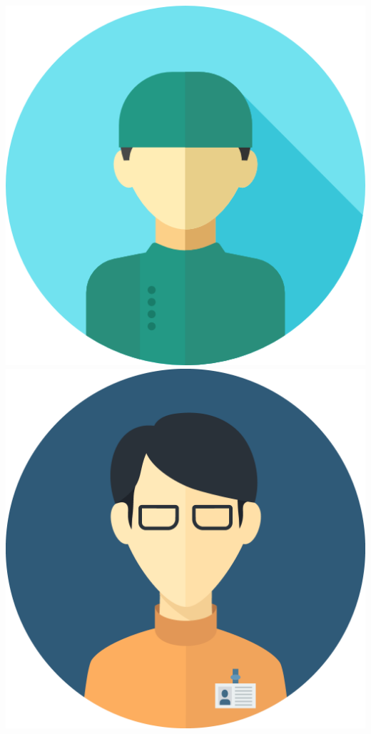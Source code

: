 \begin{frame}
    \hspace{0.4cm}
    \includegraphics[scale=0.1]{Bin/staff_avatars/doctor_2.png}
    \hspace{0.4cm}
    \includegraphics[scale=0.04]{Bin/staff_avatars/doctor_3.png}


\end{frame}
